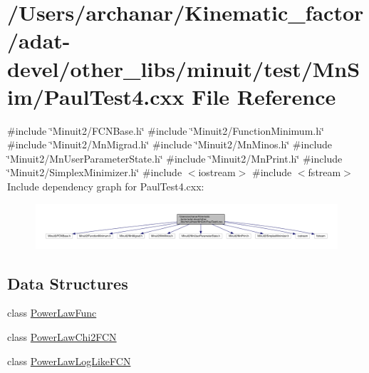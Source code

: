 \hypertarget{adat-devel_2other__libs_2minuit_2test_2MnSim_2PaulTest4_8cxx}{}\section{/\+Users/archanar/\+Kinematic\+\_\+factor/adat-\/devel/other\+\_\+libs/minuit/test/\+Mn\+Sim/\+Paul\+Test4.cxx File Reference}
\label{adat-devel_2other__libs_2minuit_2test_2MnSim_2PaulTest4_8cxx}
{\ttfamily \#include \char`\"{}Minuit2/\+F\+C\+N\+Base.\+h\char`\"{}}\newline
{\ttfamily \#include \char`\"{}Minuit2/\+Function\+Minimum.\+h\char`\"{}}\newline
{\ttfamily \#include \char`\"{}Minuit2/\+Mn\+Migrad.\+h\char`\"{}}\newline
{\ttfamily \#include \char`\"{}Minuit2/\+Mn\+Minos.\+h\char`\"{}}\newline
{\ttfamily \#include \char`\"{}Minuit2/\+Mn\+User\+Parameter\+State.\+h\char`\"{}}\newline
{\ttfamily \#include \char`\"{}Minuit2/\+Mn\+Print.\+h\char`\"{}}\newline
{\ttfamily \#include \char`\"{}Minuit2/\+Simplex\+Minimizer.\+h\char`\"{}}\newline
{\ttfamily \#include $<$iostream$>$}\newline
{\ttfamily \#include $<$fstream$>$}\newline
Include dependency graph for Paul\+Test4.\+cxx\+:
\nopagebreak
\begin{figure}[H]
\begin{center}
\leavevmode
\includegraphics[width=350pt]{d1/d42/adat-devel_2other__libs_2minuit_2test_2MnSim_2PaulTest4_8cxx__incl}
\end{center}
\end{figure}
\subsection*{Data Structures}
\begin{DoxyCompactItemize}
\item 
class \mbox{\hyperlink{classPowerLawFunc}{Power\+Law\+Func}}
\item 
class \mbox{\hyperlink{classPowerLawChi2FCN}{Power\+Law\+Chi2\+F\+CN}}
\item 
class \mbox{\hyperlink{classPowerLawLogLikeFCN}{Power\+Law\+Log\+Like\+F\+CN}}
\end{DoxyCompactItemize}

